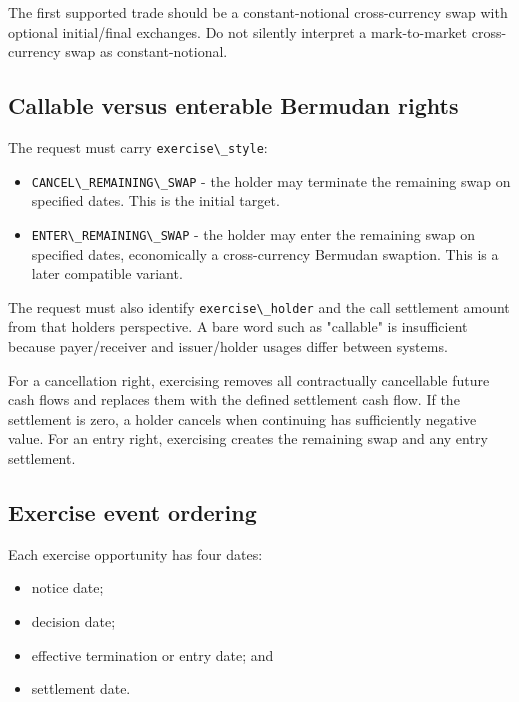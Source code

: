 \documentclass[conference]{IEEEtran}
\newcommand{\passthrough}[1]{#1}
\providecommand{\tightlist}{}
\begin{document}
The first supported trade should be a constant-notional cross-currency
swap with optional initial/final exchanges. Do not silently interpret a
mark-to-market cross-currency swap as constant-notional.

\subsection{Callable versus enterable Bermudan
rights}\label{23-callable-versus-enterable-bermudan-rights}

The request must carry \passthrough{\lstinline!exercise\_style!}:

\begin{itemize}
\tightlist
\item
  \passthrough{\lstinline!CANCEL\_REMAINING\_SWAP!} - the holder may
  terminate the remaining swap on specified dates. This is the initial
  target.
\item
  \passthrough{\lstinline!ENTER\_REMAINING\_SWAP!} - the holder may
  enter the remaining swap on specified dates, economically a
  cross-currency Bermudan swaption. This is a later compatible variant.
\end{itemize}

The request must also identify
\passthrough{\lstinline!exercise\_holder!} and the call settlement
amount from that holder\textquotesingle s perspective. A bare word such
as "callable" is insufficient because payer/receiver and issuer/holder
usages differ between systems.

For a cancellation right, exercising removes all contractually
cancellable future cash flows and replaces them with the defined
settlement cash flow. If the settlement is zero, a holder cancels when
continuing has sufficiently negative value. For an entry right,
exercising creates the remaining swap and any entry settlement.

\subsection{Exercise event
ordering}\label{24-exercise-event-ordering}

Each exercise opportunity has four dates:

\begin{itemize}
\tightlist
\item
  notice date;
\item
  decision date;
\item
  effective termination or entry date; and
\item
  settlement date.
\end{itemize}
\end{document}
